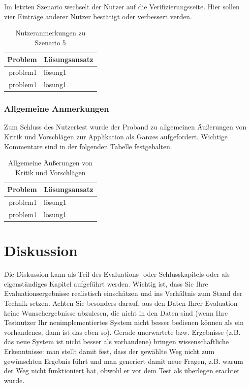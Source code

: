 Im letzten Szenario wechselt der Nutzer auf die Verifizierungsseite. Hier sollen vier Einträge anderer Nutzer bestätigt oder verbessert verden.

\begin{table}[h!]
	\centering
	\begin{tabular}{|r|l|}
		\hline
		\textbf{Problem} & \textbf{Lösungsansatz}\\
		\hline
		\hline
		problem1 & lösung1\\
		\hline
		problem1 & lösung1\\
		\hline
	\end{tabular}
	\caption{Nutzeranmerkungen zu Szenario 5}
	\label{table:szenario5}
\end{table}


\subsubsection{Allgemeine Anmerkungen}

Zum Schluss des Nutzertest wurde der Proband zu allgemeinen Äußerungen von Kritik und Vorschlägen zur Applikation als Ganzes aufgefordert. Wichtige Kommentare sind in der folgenden Tabelle festgehalten.

\begin{table}[h!]
	\centering
	\begin{tabular}{|r|l|}
		\hline
		\textbf{Problem} & \textbf{Lösungsansatz}\\
		\hline
		\hline
		problem1 & lösung1\\
		\hline
		problem1 & lösung1\\
		\hline
	\end{tabular}
	\caption{Allgemeine Äußerungen von Kritik und Vorschlägen}
	\label{table:usertestgeneral}
\end{table}


\section{Diskussion}
Die Diskussion kann als Teil des Evaluations- oder Schlusskapitels oder als eigenständiges Kapitel aufgeführt werden. Wichtig ist, dass Sie Ihre Evaluationsergebnisse realistisch einschätzen und ins Verhältnis zum Stand der Technik setzen. Achten Sie besonders darauf, aus den Daten Ihrer Evaluation keine Wunschergebnisse abzulesen, die nicht in den Daten sind (wenn Ihre Testnutzer Ihr neuimplementiertes System nicht besser bedienen können als ein vorhandenes, dann ist das eben so). Gerade unerwartete bzw.  Ergebnisse (z.B. das neue System ist nicht besser als vorhandene) bringen wissenschaftliche Erkenntnisse: man stellt damit fest, dass der gewählte Weg nicht zum gewünschten Ergebnis führt und man generiert damit neue Fragen, z.B. warum der Weg nicht funktioniert hat, obwohl er vor dem Test als überlegen erachtet wurde.

